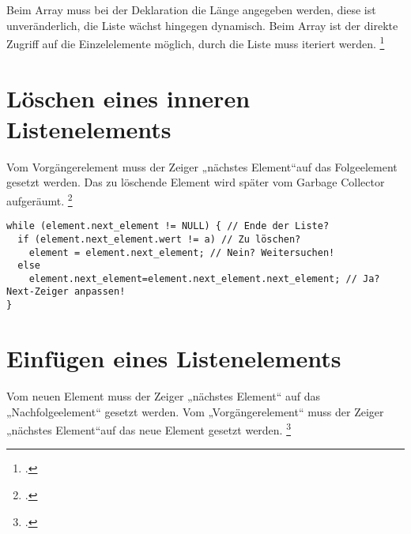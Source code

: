 \documentclass{lehramt-informatik-haupt}
\begin{document}
Beim Array muss bei der Deklaration die Länge angegeben werden, diese
ist unveränderlich, die Liste wächst hingegen dynamisch. Beim Array
ist der direkte Zugriff auf die Einzelelemente möglich, durch die Liste
muss iteriert werden.
\footcite[Seite 4]{aud:fs:4}

\newcommand\tmpelement[1]{%
  \tikz{
    \node[
      draw,
      inner sep=2pt,
      minimum width=8mm,
      outer sep=0,
      text height=1.5ex,
      text depth=.3ex,
    ](a){#1}
  }
  \tikz{
    \node[
      draw,
      inner sep=2pt,
      minimum width=3mm,
      outer sep=0,
      text height=1.5ex,
      text depth=.3ex,
    ](a){}
  }
}


%

\section{Löschen eines inneren Listenelements}

Vom Vorgängerelement muss der Zeiger „nächstes Element“auf das
Folgeelement gesetzt werden. Das zu löschende Element wird später vom
Garbage Collector aufgeräumt.
\footcite[Seite 9-10]{aud:fs:4}

\begin{verbatim}
while (element.next_element != NULL) { // Ende der Liste?
  if (element.next_element.wert != a) // Zu löschen?
    element = element.next_element; // Nein? Weitersuchen!
  else
    element.next_element=element.next_element.next_element; // Ja? Next-Zeiger anpassen!
}
\end{verbatim}

\section{Einfügen eines Listenelements}

Vom neuen Element muss der Zeiger „nächstes Element“ auf das
„Nachfolgeelement“ gesetzt werden. Vom „Vorgängerelement“ muss der
Zeiger „nächstes Element“auf das neue Element gesetzt werden.
\footcite[Seite 11-12]{aud:fs:4}
\end{document}
